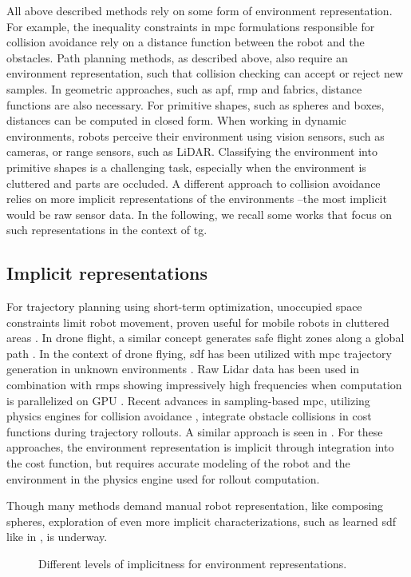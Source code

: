 All above described methods rely on some form of environment
representation. For example, the inequality constraints in
\ac{mpc} formulations responsible for collision avoidance
rely on a distance function between the robot and the
obstacles. Path planning methods, as described above, 
also require an environment representation, such that
collision checking can accept or reject new samples. In
geometric approaches, such as \ac{apf}, \ac{rmp} and
\ac{fabrics}, distance functions are also necessary.
For primitive shapes, such as spheres and boxes, distances
can be computed in closed form. When working in dynamic
environments, robots perceive their environment using vision
sensors, such as cameras, or range sensors, such as LiDAR.
Classifying the environment into primitive shapes is a
challenging task, especially when the environment is
cluttered and parts are occluded. A different approach to
collision avoidance relies on more implicit representations
of the environments --the most implicit would be raw sensor
data. In the following, we recall some works that focus on
such representations in the context of \ac{tg}.

\subsection{Implicit representations}
\label{sub:implicit_representations}

For trajectory planning using short-term optimization,
unoccupied space constraints limit robot movement, proven
useful for mobile robots in cluttered areas
\cite{Brito2019}. In drone flight, a similar concept
generates safe flight zones along a global path
\cite{Liu2017a,Tordesillas2019a,tordesillas2021mader}. In
the context of drone flying, \ac{sdf} has been utilized with
\ac{mpc} trajectory generation in unknown environments
\cite{Oleynikova2017voxblox}. Raw Lidar data has been used
in combination with \acp{rmp} showing impressively high
frequencies when computation is parallelized on GPU
\cite{Pantic2023obstacle}. Recent advances in sampling-based
\ac{mpc}, utilizing physics engines for collision avoidance
\cite{Pezzato2023sampling}, integrate obstacle collisions in
cost functions during trajectory rollouts. A similar
approach is seen in \cite{Sundaralingam2023curobo}. For
these approaches, the environment representation is implicit
through integration into the cost function, but requires
accurate modeling of the robot and the environment in the
physics engine used for rollout computation.

Though many methods demand manual robot representation, like
composing spheres, exploration of even more implicit
characterizations, such as learned \ac{sdf} like in
\cite{Liu2022regularized,Koptev2023neural}, is underway.

\begin{figure}
  \centering
  
  \caption{Different levels of implicitness for environment representations.}
  \label{fig:overview}
\end{figure}


